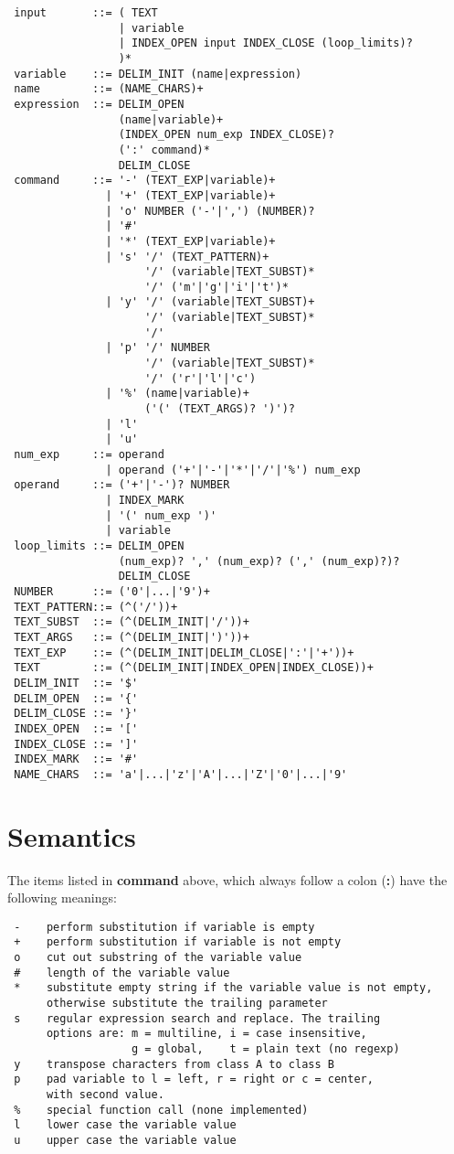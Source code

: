 \footnotesize
\begin{verbatim}
 input       ::= ( TEXT
                 | variable
                 | INDEX_OPEN input INDEX_CLOSE (loop_limits)?
                 )*
 variable    ::= DELIM_INIT (name|expression)
 name        ::= (NAME_CHARS)+
 expression  ::= DELIM_OPEN
                 (name|variable)+
                 (INDEX_OPEN num_exp INDEX_CLOSE)?
                 (':' command)*
                 DELIM_CLOSE
 command     ::= '-' (TEXT_EXP|variable)+
               | '+' (TEXT_EXP|variable)+
               | 'o' NUMBER ('-'|',') (NUMBER)?
               | '#'
               | '*' (TEXT_EXP|variable)+
               | 's' '/' (TEXT_PATTERN)+
                     '/' (variable|TEXT_SUBST)*
                     '/' ('m'|'g'|'i'|'t')*
               | 'y' '/' (variable|TEXT_SUBST)+
                     '/' (variable|TEXT_SUBST)*
                     '/'
               | 'p' '/' NUMBER
                     '/' (variable|TEXT_SUBST)*
                     '/' ('r'|'l'|'c')
               | '%' (name|variable)+
                     ('(' (TEXT_ARGS)? ')')?
               | 'l'
               | 'u'
 num_exp     ::= operand
               | operand ('+'|'-'|'*'|'/'|'%') num_exp
 operand     ::= ('+'|'-')? NUMBER
               | INDEX_MARK
               | '(' num_exp ')'
               | variable
 loop_limits ::= DELIM_OPEN
                 (num_exp)? ',' (num_exp)? (',' (num_exp)?)?
                 DELIM_CLOSE
 NUMBER      ::= ('0'|...|'9')+
 TEXT_PATTERN::= (^('/'))+
 TEXT_SUBST  ::= (^(DELIM_INIT|'/'))+
 TEXT_ARGS   ::= (^(DELIM_INIT|')'))+
 TEXT_EXP    ::= (^(DELIM_INIT|DELIM_CLOSE|':'|'+'))+
 TEXT        ::= (^(DELIM_INIT|INDEX_OPEN|INDEX_CLOSE))+
 DELIM_INIT  ::= '$'
 DELIM_OPEN  ::= '{'
 DELIM_CLOSE ::= '}'
 INDEX_OPEN  ::= '['
 INDEX_CLOSE ::= ']'
 INDEX_MARK  ::= '#'
 NAME_CHARS  ::= 'a'|...|'z'|'A'|...|'Z'|'0'|...|'9'
\end{verbatim}
\normalsize

\section{Semantics}

The items listed in {\bf command} above, which always follow a colon ({\bf :})
have the following meanings:

\footnotesize
\begin{verbatim}
 -    perform substitution if variable is empty
 +    perform substitution if variable is not empty
 o    cut out substring of the variable value
 #    length of the variable value
 *    substitute empty string if the variable value is not empty,
      otherwise substitute the trailing parameter
 s    regular expression search and replace. The trailing
      options are: m = multiline, i = case insensitive,
                   g = global,    t = plain text (no regexp)
 y    transpose characters from class A to class B
 p    pad variable to l = left, r = right or c = center,
      with second value.
 %    special function call (none implemented)
 l    lower case the variable value
 u    upper case the variable value
\end{verbatim}
\normalsize

